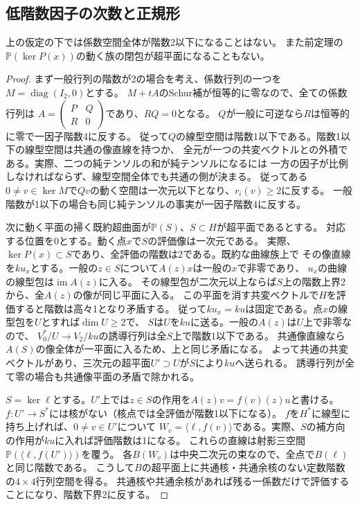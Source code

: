 \subsection{低階数因子の次数と正規形}
\begin{lemma}[階数2以下の係数空間と平面族が掃く超平面の排除]\label{lem:rank-five-hyperplane}
上の仮定の下では係数空間全体が階数2以下になることはない。
また前定理の$\mathbb P(\ker P(x))$の動く族の閉包が超平面になることもない。
\end{lemma}
\begin{proof}
まず一般行列の階数が2の場合を考え、係数行列の一つを$M=\operatorname{diag}(I_2,0)$とする。
$M+tA$のSchur補が恒等的に零なので、全ての係数行列は
$A=\left(\begin{smallmatrix}P&Q\\R&0\end{smallmatrix}\right)$であり、$RQ=0$となる。
$Q$が一般に可逆なら$R$は恒等的に零で一因子階数4に反する。
従って$Q$の線型空間は階数1以下である。階数1以下の線型空間は共通の像直線を持つか、
全元が一つの共変ベクトルとの外積である。実際、二つの純テンソルの和が純テンソルになるには
一方の因子が比例しなければならず、線型空間全体でも共通の側が決まる。
従ってある$0\ne v\in\ker M$で$Qv$の動く空間は一次元以下となり、$r_i(v)\ge2$に反する。
一般階数が1以下の場合も同じ純テンソルの事実が一因子階数4に反する。

次に動く平面の掃く既約超曲面が$\mathbb P(S)$、$S\subset H$が超平面であるとする。
対応する位置を0とする。動く点$x$で$S$の評価像は一次元である。
実際、$\ker P(x)\subset S$であり、全評価の階数は2である。既約な曲線族上で
その像直線を$ku_x$とする。一般の$z\in S$について$A(z)x$は一般の$x$で非零であり、
$u_x$の曲線の線型包は$\operatorname{im}A(z)$に入る。
その線型包が二次元以上ならば$S$上の階数上界2から、全$A(z)$の像が同じ平面に入る。
この平面を消す共変ベクトルで$H$を評価すると階数は高々1となり矛盾する。
従って$ku_x=ku$は固定である。点$x$の線型包を$U$とすれば$\dim U\ge2$で、
$S$は$U$を$ku$に送る。一般の$A(z)$は$U$上で非零なので、
$V_0^*/U\to V_2/ku$の誘導行列は全$S$上で階数1以下である。
共通像直線なら$A(S)$の像全体が一平面に入るため、上と同じ矛盾になる。
よって共通の共変ベクトルがあり、三次元の超平面$U'\supset U$が$S$により$ku$へ送られる。
誘導行列が全て零の場合も共通像平面の矛盾で除かれる。

$S=\ker\ell$とする。$U'$上では$z\in S$の作用を$A(z)v=f(v)(z)u$と書ける。
$f:U'\to S^*$には核がない（核点では全評価が階数1以下になる）。
$f$を$H^*$に線型に持ち上げれば、$0\ne v\in U'$について
$W_v=\langle\ell,f(v)\rangle$である。実際、$S$の補方向の作用が$ku$に入れば評価階数は1になる。
これらの直線は射影三空間$\mathbb P(\langle\ell,f(U')\rangle)$を覆う。
各$B(W_v)$は中央二次元の束なので、全点で$B(\ell)$と同じ階数である。
こうして$B$の超平面上に共通核・共通余核のない定数階数の$4\times4$行列空間を得る。
共通核や共通余核があれば残る一係数だけで評価することになり、階数下界2に反する。


\end{proof}
